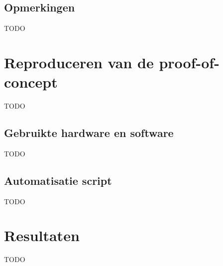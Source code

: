 \subsection{Opmerkingen}
\label{subsec:opmerkingen}
TODO %

\section{Reproduceren van de proof-of-concept}
\label{sec:reproduceren-van-de-proof-of-concept}
TODO %

\subsection{Gebruikte hardware en software}
\label{subsec:gebruikte-hardware-en-software}
TODO %

\subsection{Automatisatie script}
\label{subsec:automatisatie-script}
TODO %

\section{Resultaten}
\label{sec:resultaten}
TODO %